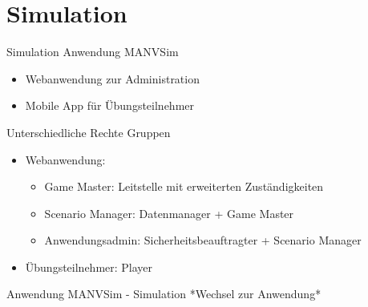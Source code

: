 
\section{Simulation}

\begin{frame}{Simulation}
	Anwendung MANVSim
	\begin{itemize}
		\item Webanwendung zur Administration
		\item Mobile App für Übungsteilnehmer
	\end{itemize}
	Unterschiedliche Rechte Gruppen
	\begin{itemize}
		\item Webanwendung:
		\begin{itemize}
			\item Game Master: Leitstelle mit erweiterten Zuständigkeiten
			\item Scenario Manager: Datenmanager + Game Master
			\item Anwendungsadmin: Sicherheitsbeauftragter + Scenario Manager
		\end{itemize}
		\item Übungsteilnehmer: Player 
	\end{itemize}
\end{frame}

\begin{frame}{Anwendung MANVSim - Simulation}
	*Wechsel zur Anwendung*
\end{frame}
